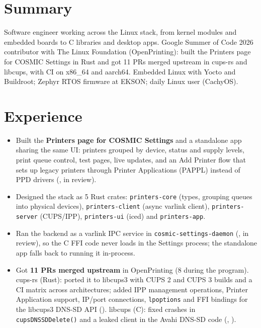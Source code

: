 \documentclass[10pt]{article}
\begin{document}

\section*{Summary}
Software engineer working across the Linux stack, from kernel modules and embedded boards to C libraries and desktop apps. Google Summer of Code 2026 contributor with The Linux Foundation (OpenPrinting): built the Printers page for COSMIC Settings in Rust and got 11 PRs merged upstream in cups-rs and libcups, with CI on x86\_64 and aarch64. Embedded Linux with Yocto and Buildroot; Zephyr RTOS firmware at EKSON; daily Linux user (CachyOS).

\section*{Experience}
\begin{itemize}
  \item Built the \textbf{Printers page for COSMIC Settings} and a standalone app sharing the same UI: printers grouped by device, status and supply levels, print queue control, test pages, live updates, and an Add Printer flow that sets up legacy printers through Printer Applications (PAPPL) instead of PPD drivers (, in review).
  \item Designed the stack as 5 Rust crates: \texttt{printers-core} (types, grouping queues into physical devices), \texttt{printers-client} (async varlink client), \texttt{printers-server} (CUPS/IPP), \texttt{printers-ui} (iced) and \texttt{printers-app}.
  \item Ran the backend as a varlink IPC service in \texttt{cosmic-settings-daemon} (, in review), so the C FFI code never loads in the Settings process; the standalone app falls back to running it in-process.
  \item Got \textbf{11 PRs merged upstream} in OpenPrinting (8 during the program). cups-rs (Rust): ported it to libcups3 with CUPS 2 and CUPS 3 builds and a CI matrix across architectures; added IPP management operations, Printer Application support, IP/port connections, \texttt{lpoptions} and FFI bindings for the libcups3 DNS-SD API (). libcups (C): fixed crashes in \texttt{cupsDNSSDDelete()} and a leaked client in the Avahi DNS-SD code (, ).
\end{itemize}
\end{document}
